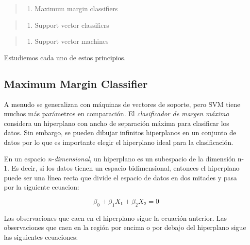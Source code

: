 \documentclass[
]{book}
\providecommand{\tightlist}{%
  \setlength{\itemsep}{0pt}\setlength{\parskip}{0pt}}
\begin{document}
\begin{quote}
\begin{enumerate}
\def\labelenumi{\arabic{enumi}.}
\tightlist
\item
  Maximum margin classifiers
\end{enumerate}
\end{quote}

\begin{quote}
\begin{enumerate}
\def\labelenumi{\arabic{enumi}.}
\setcounter{enumi}{1}
\tightlist
\item
  Support vector classifiers
\end{enumerate}
\end{quote}

\begin{quote}
\begin{enumerate}
\def\labelenumi{\arabic{enumi}.}
\setcounter{enumi}{2}
\tightlist
\item
  Support vector machines
\end{enumerate}
\end{quote}

Estudiemos cada uno de estos principios.

\hypertarget{maximum-margin-classifier}{%
\subsection{Maximum Margin Classifier}\label{maximum-margin-classifier}}

A menudo se generalizan con máquinas de vectores de soporte, pero SVM tiene muchos más parámetros en comparación. El \emph{clasificador de margen máximo} considera un hiperplano con ancho de separación máxima para clasificar los datos. Sin embargo, se pueden dibujar infinitos hiperplanos en un conjunto de datos por lo que es importante elegir el hiperplano ideal para la clasificación.

En un espacio \emph{n-dimensional}, un hiperplano es un subespacio de la dimensión n-1. Es decir, si los datos tienen un espacio bidimensional, entonces el hiperplano puede ser una línea recta que divide el espacio de datos en dos mitades y pasa por la siguiente ecuacion:

\[\beta_0 + \beta_1X_1 + \beta_2X_2=0\]

Las observaciones que caen en el hiperplano sigue la ecuación anterior. Las observaciones que caen en la región por encima o por debajo del hiperplano sigue las siguientes ecuaciones:
\end{document}
